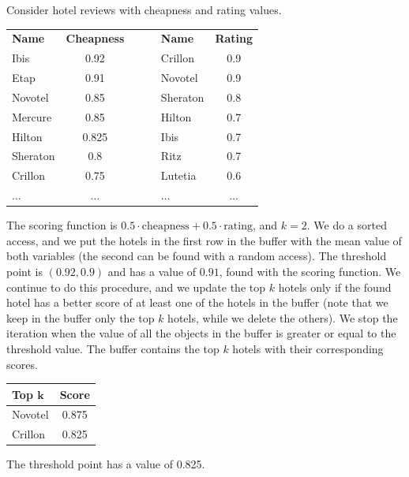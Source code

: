 \begin{example}
    Consider hotel reviews with cheapness and rating values.
    \begin{table}[H]
        \centering
        \begin{tabular}{|lc|c|lc|}
        \cline{1-2} \cline{4-5}
        \textbf{Name} & \textbf{Cheapness} & $\:\:\:\:\:\:$ & \textbf{Name} & \textbf{Rating} \\ \cline{1-2} \cline{4-5} 
        Ibis          & 0.92               &                & Crillon       & 0.9             \\ 
        Etap          & 0.91               &                & Novotel       & 0.9             \\ 
        Novotel       & 0.85               &                & Sheraton      & 0.8             \\ 
        Mercure       & 0.85               &                & Hilton        & 0.7             \\ 
        Hilton        & 0.825              &                & Ibis          & 0.7             \\ 
        Sheraton      & 0.8                &                & Ritz          & 0.7             \\ 
        Crillon       & 0.75               &                & Lutetia       & 0.6             \\ 
        $\dots$       & $\dots$            &                & $\dots$       & $\dots$         \\ \cline{1-2} \cline{4-5} 
        \end{tabular}
    \end{table}
    The scoring function is $0.5 \cdot \text{cheapness}+0.5 \cdot \text{rating}$, and $k=2$. 
    We do a sorted access, and we put the hotels in the first row in the buffer with the mean value of both variables (the second can be found with a random access). 
    The threshold point is $(0.92,0.9)$ and has a value of $0.91$, found with the scoring function. 
    We continue to do this procedure, and we update the top $k$ hotels only if the found hotel has a better score of at least one of the hotels in the buffer (note that we keep in the buffer only the top $k$ hotels, while we delete the others). 
    We stop the iteration when the value of all the objects in the buffer is greater or equal to the threshold value. 
    The buffer contains the top $k$ hotels with their corresponding scores.
    \begin{table}[H]
        \centering
        \begin{tabular}{|lc|}
        \hline
        \textbf{Top $\boldsymbol{k}$} & \textbf{Score} \\ \hline
        Novotel                       & 0.875          \\ 
        Crillon                       & 0.825          \\ \hline
        \end{tabular}
    \end{table}
    The threshold point has a value of 0.825.
\end{example}

